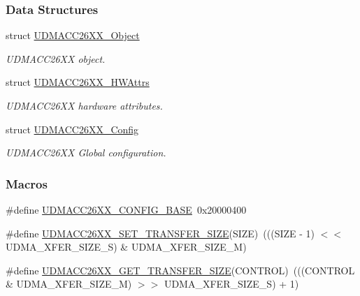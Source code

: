 \subsubsection*{Data Structures}
\begin{DoxyCompactItemize}
\item 
struct \hyperlink{struct_u_d_m_a_c_c26_x_x___object}{U\-D\-M\-A\-C\-C26\-X\-X\-\_\-\-Object}
\begin{DoxyCompactList}\small\item\em U\-D\-M\-A\-C\-C26\-X\-X object. \end{DoxyCompactList}\item 
struct \hyperlink{struct_u_d_m_a_c_c26_x_x___h_w_attrs}{U\-D\-M\-A\-C\-C26\-X\-X\-\_\-\-H\-W\-Attrs}
\begin{DoxyCompactList}\small\item\em U\-D\-M\-A\-C\-C26\-X\-X hardware attributes. \end{DoxyCompactList}\item 
struct \hyperlink{struct_u_d_m_a_c_c26_x_x___config}{U\-D\-M\-A\-C\-C26\-X\-X\-\_\-\-Config}
\begin{DoxyCompactList}\small\item\em U\-D\-M\-A\-C\-C26\-X\-X Global configuration. \end{DoxyCompactList}\end{DoxyCompactItemize}
\subsubsection*{Macros}
\begin{DoxyCompactItemize}
\item 
\#define \hyperlink{_u_d_m_a_c_c26_x_x_8h_ab956c64f89045e5c6546115ec6062a7f}{U\-D\-M\-A\-C\-C26\-X\-X\-\_\-\-C\-O\-N\-F\-I\-G\-\_\-\-B\-A\-S\-E}~0x20000400
\item 
\#define \hyperlink{_u_d_m_a_c_c26_x_x_8h_a5c7843573980a2380bd0adf65f58a433}{U\-D\-M\-A\-C\-C26\-X\-X\-\_\-\-S\-E\-T\-\_\-\-T\-R\-A\-N\-S\-F\-E\-R\-\_\-\-S\-I\-Z\-E}(S\-I\-Z\-E)~(((S\-I\-Z\-E -\/ 1) $<$$<$ U\-D\-M\-A\-\_\-\-X\-F\-E\-R\-\_\-\-S\-I\-Z\-E\-\_\-\-S) \& U\-D\-M\-A\-\_\-\-X\-F\-E\-R\-\_\-\-S\-I\-Z\-E\-\_\-\-M)
\item 
\#define \hyperlink{_u_d_m_a_c_c26_x_x_8h_af51cbac1b7f6cc86b9ea0db72426dade}{U\-D\-M\-A\-C\-C26\-X\-X\-\_\-\-G\-E\-T\-\_\-\-T\-R\-A\-N\-S\-F\-E\-R\-\_\-\-S\-I\-Z\-E}(C\-O\-N\-T\-R\-O\-L)~(((C\-O\-N\-T\-R\-O\-L \& U\-D\-M\-A\-\_\-\-X\-F\-E\-R\-\_\-\-S\-I\-Z\-E\-\_\-\-M) $>$$>$ U\-D\-M\-A\-\_\-\-X\-F\-E\-R\-\_\-\-S\-I\-Z\-E\-\_\-\-S) + 1)
\end{DoxyCompactItemize}
